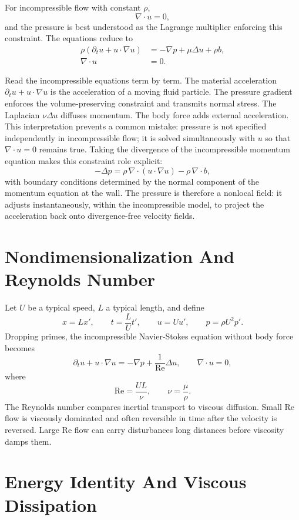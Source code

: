 For incompressible flow with constant \(\rho\),
\[
  \nabla\cdot u=0,
\]
and the pressure is best understood as the Lagrange multiplier enforcing this
constraint. The equations reduce to
\[
  \boxed{
  \begin{aligned}
  \rho(\partial_tu+u\cdot\nabla u)&=-\nabla p+\mu\Delta u+\rho b,\\
  \nabla\cdot u&=0.
  \end{aligned}
  }
\]

Read the incompressible equations term by term. The material acceleration
\(\partial_tu+u\cdot\nabla u\) is the acceleration of a moving fluid particle.
The pressure gradient enforces the volume-preserving constraint and transmits
normal stress. The Laplacian \(\nu\Delta u\) diffuses momentum. The body force
adds external acceleration. This interpretation prevents a common mistake:
pressure is not specified independently in incompressible flow; it is solved
simultaneously with \(u\) so that \(\nabla\cdot u=0\) remains true.
Taking the divergence of the incompressible momentum equation makes this
constraint role explicit:
\[
  -\Delta p
  =
  \rho\,\nabla\cdot(u\cdot\nabla u)-\rho\,\nabla\cdot b,
\]
with boundary conditions determined by the normal component of the momentum
equation at the wall. The pressure is therefore a nonlocal field: it adjusts
instantaneously, within the incompressible model, to project the acceleration
back onto divergence-free velocity fields.

\section{Nondimensionalization And Reynolds Number}
\label{sec:reynolds-number}

Let \(U\) be a typical speed, \(L\) a typical length, and define
\[
  x=Lx',\qquad
  t=\frac{L}{U}t',\qquad
  u=Uu',\qquad
  p=\rho U^2p'.
\]
Dropping primes, the incompressible Navier-Stokes equation without body force
becomes
\[
  \partial_tu+u\cdot\nabla u
  =
  -\nabla p+\frac1{\mathrm{Re}}\Delta u,
  \qquad
  \nabla\cdot u=0,
\]
where
\[
  \boxed{\mathrm{Re}=\frac{UL}{\nu}},\qquad \nu=\frac{\mu}{\rho}.
\]
The Reynolds number compares inertial transport to viscous diffusion. Small
\(\mathrm{Re}\) flow is viscously dominated and often reversible in time after
the velocity is reversed. Large \(\mathrm{Re}\) flow can carry disturbances
long distances before viscosity damps them.

\section{Energy Identity And Viscous Dissipation}
\label{sec:fluid-energy-identity}

